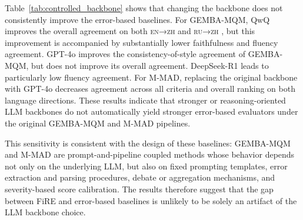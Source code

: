 \documentclass{article}
\theoremstyle{plain}
\theoremstyle{definition}
\theoremstyle{remark}
\newcommand{\enzh}{\textsc{en→zh} }
\newcommand{\ruzh}{\textsc{ru→zh} }
\begin{document}
Table~\ref{tab:controlled_backbone} shows that changing the backbone does not consistently improve the error-based baselines. For GEMBA-MQM, QwQ improves the overall agreement on both \enzh and \ruzh, but this improvement is accompanied by substantially lower faithfulness and fluency agreement. GPT-4o improves the consistency-of-style agreement of GEMBA-MQM, but does not improve its overall agreement. DeepSeek-R1 leads to particularly low fluency agreement. For M-MAD, replacing the original backbone with GPT-4o decreases agreement across all criteria and overall ranking on both language directions. These results indicate that stronger or reasoning-oriented LLM backbones do not automatically yield stronger error-based evaluators under the original GEMBA-MQM and M-MAD pipelines.

This sensitivity is consistent with the design of these baselines: GEMBA-MQM and M-MAD are prompt-and-pipeline coupled methods whose behavior depends not only on the underlying LLM, but also on fixed prompting templates, error extraction and parsing procedures, debate or aggregation mechanisms, and severity-based score calibration. The results therefore suggest that the gap between FiRE and error-based baselines is unlikely to be solely an artifact of the LLM backbone choice.

\begin{table}[h]
\centering
\caption{Backbone sensitivity analysis for error-based baselines on ranked pairwise data. Values are percentage agreement (\%). Original denotes the backbone used in the original implementation of each baseline: \texttt{gpt-3.5-turbo} for GEMBA-MQM and \texttt{gpt-4o-mini} for M-MAD.}
\label{tab:controlled_backbone}
\small
\setlength{\tabcolsep}{4pt}
\end{table}
\end{document}
